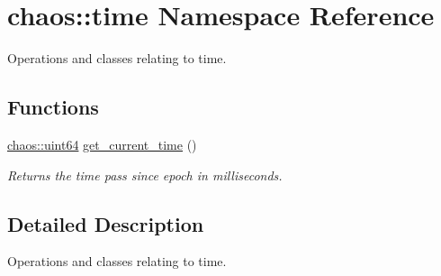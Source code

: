 \hypertarget{namespacechaos_1_1time}{}\section{chaos\+:\+:time Namespace Reference}
\label{namespacechaos_1_1time}


Operations and classes relating to time.  


\subsection*{Functions}
\begin{DoxyCompactItemize}
\item 
\hypertarget{namespacechaos_1_1time_aaf97a80d1887b42f7a026d102382d27d}{}\hyperlink{namespacechaos_a34fe5f5bfc3ef6d80b5d094ed91b4d6e}{chaos\+::uint64} \hyperlink{namespacechaos_1_1time_aaf97a80d1887b42f7a026d102382d27d}{get\+\_\+current\+\_\+time} ()\label{namespacechaos_1_1time_aaf97a80d1887b42f7a026d102382d27d}

\begin{DoxyCompactList}\small\item\em Returns the time pass since epoch in milliseconds. \end{DoxyCompactList}\end{DoxyCompactItemize}


\subsection{Detailed Description}
Operations and classes relating to time. 